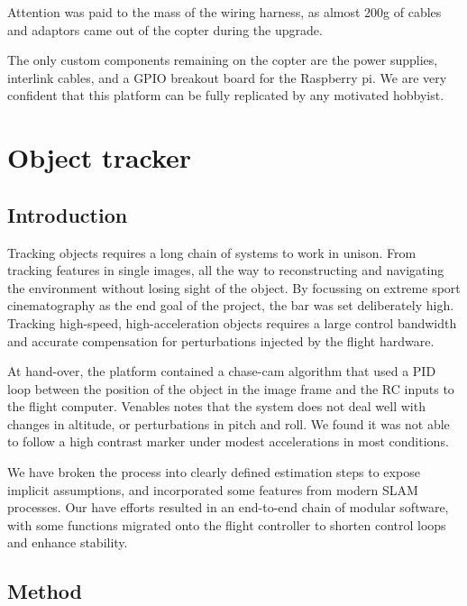 \documentclass{article}
\begin{document}
      Attention was paid to the mass of the wiring harness, as almost 200g of cables and adaptors came out of the copter during the upgrade.

      The only custom components remaining on the copter are the power supplies, interlink cables, and a GPIO breakout board for the Raspberry pi.  We are very confident that this platform can be fully replicated by any motivated hobbyist.

\section{Object tracker}
  \subsection{Introduction}

    Tracking objects requires a long chain of systems to work in unison.  From tracking features in single images, all the way to reconstructing and navigating the environment without losing sight of the object.
    By focussing on extreme sport cinematography as the end goal of the project, the bar was set deliberately high.
    Tracking high-speed, high-acceleration objects requires a large control bandwidth and accurate compensation for perturbations injected by the flight hardware.  

    At hand-over, the platform contained a chase-cam algorithm that used a PID loop between the position of the object in the image frame and the RC inputs to the flight computer.  Venables \cite{Venables} notes that the system does not deal well with changes in altitude, or perturbations in pitch and roll.  We found it was not able to follow a high contrast marker under modest accelerations in most conditions.

    We have broken the process into clearly defined estimation steps to expose implicit assumptions, and incorporated some features from modern SLAM processes.  Our have efforts resulted in an end-to-end chain of modular software, with some functions migrated onto the flight controller to shorten control loops and enhance stability. 

  \subsection{Method}
\end{document}
